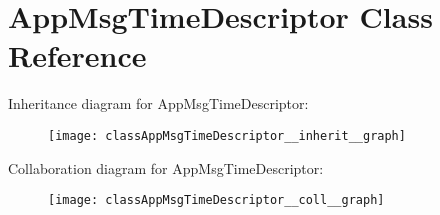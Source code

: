 \hypertarget{classAppMsgTimeDescriptor}{}\section{App\+Msg\+Time\+Descriptor Class Reference}
\label{classAppMsgTimeDescriptor}


Inheritance diagram for App\+Msg\+Time\+Descriptor\+:\nopagebreak
\begin{figure}[H]
\begin{center}
\leavevmode
\texttt{[image: classAppMsgTimeDescriptor\_\_inherit\_\_graph]}
\end{center}
\end{figure}


Collaboration diagram for App\+Msg\+Time\+Descriptor\+:\nopagebreak
\begin{figure}[H]
\begin{center}
\leavevmode
\texttt{[image: classAppMsgTimeDescriptor\_\_coll\_\_graph]}
\end{center}
\end{figure}
